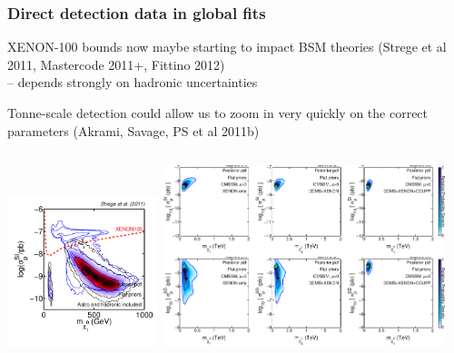 \documentclass[xcolor=dvipsnames]{beamer}
\begin{document}
\begin{frame}
\frametitle{Direct detection data in global fits}
XENON-100 bounds now maybe starting to impact BSM theories (Strege et al 2011, Mastercode 2011+, Fittino 2012)\\
  {\footnotesize\hspace{3mm}-- depends strongly on hadronic uncertainties}
\vspace{2mm}

Tonne-scale detection could allow us to zoom in very quickly on the correct parameters (Akrami, Savage, PS et al 2011b)
\vspace{2mm}

\begin{columns}
\includegraphics[width=0.33\textwidth]{Strege11_DD}\hspace{3mm}
\includegraphics[width=0.62\textwidth]{DD_DDparams}
\end{columns}

\end{frame}
\end{document}
